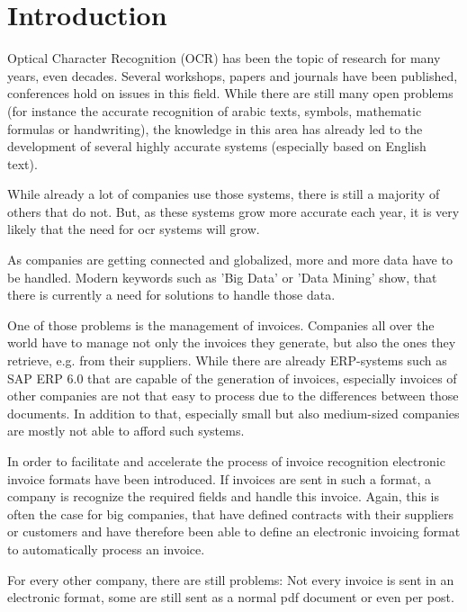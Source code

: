 %
% 

\chapter{Introduction}
\label{cha1}
Optical Character Recognition (OCR) has been the topic of research for many years, even decades. Several workshops, papers and journals have been published, conferences hold on issues in this field. While there are still many open problems (for instance the accurate recognition of arabic texts, symbols, mathematic formulas or handwriting), the knowledge in this area has already led to the development of several highly accurate systems (especially based on English text).

While already a lot of companies use those systems, there is still a majority of others that do not. But, as these systems grow more accurate each year, it is very likely that the need for ocr systems will grow. \par
As companies are getting connected and globalized, more and more data have to be handled. Modern keywords such as 'Big Data' or 'Data Mining' show, that there is currently a need for solutions to handle those data.

One of those problems is the management of invoices. Companies all over the world have to manage not only the invoices they generate, but also the ones they retrieve, e.g. from their suppliers. While there are already ERP-systems such as SAP ERP 6.0 that are capable of the generation of invoices, especially invoices of other companies are not that easy to process due to the differences between those documents. In addition to that, especially small but also medium-sized companies are mostly not able to afford such systems. 

In order to facilitate and accelerate the process of invoice recognition electronic invoice formats have been introduced. If invoices are sent in such a format, a company is recognize the required fields and handle this invoice. Again, this is often the case for big companies, that have defined contracts with their suppliers or customers and have therefore been able to define an electronic invoicing format to automatically process an invoice.

For every other company, there are still problems: Not every invoice is sent in an electronic format, some are still sent as a normal pdf document or even per post.


